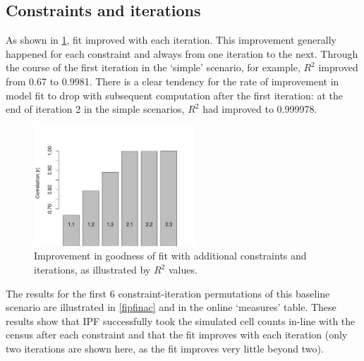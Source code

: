 \documentclass[a4paper,10pt]{article}
\begin{document}

\subsection{Constraints and iterations}
As shown in \cref{fnconscor}, fit
improved with each iteration.
This improvement generally happened for each constraint 
and always from one iteration to the next.
Through the course of the first 
iteration in the `simple' scenario, for example, $R^2$ improved
from 0.67 to 0.9981. There is a clear tendency for the rate of improvement
in model fit to drop with subsequent computation after the first iteration: 
at the end of iteration 2 in the simple scenarios, $R^2$ had improved to 0.999978.   

\begin{figure}[h]
 \begin{center}
  \includegraphics[width=6cm]{corr-baseline}
 \end{center}
\caption{Improvement in goodness of fit with additional constraints and iterations, 
as illustrated by $R^2$ values.}
\label{fnconscor}
\end{figure}

The results for the first 6 constraint-iteration permutations 
of this baseline scenario are illustrated in \cref{fipfinac} and %
in the online `measures' table. These results show that IPF successfully 
took the simulated cell counts in-line with the census after each constraint 
and that the fit improves with each iteration (only two iterations are 
shown here, as the fit improves very little beyond two).
\end{document}
